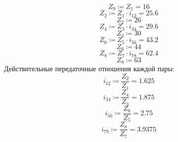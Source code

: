 \documentclass{article}
\newcommand{\defeq}{\coloneq} %
\begin{document}
\begin{equation*}
\textit{Z}_{\textit{9}} \defeq \textit{Z}_{\textit{1}} = {16}
\end{equation*}
\begin{equation*}
\textit{Z}_{\textit{2}} \defeq \textit{Z}_{\textit{1}} \cdot \textit{i}_{\textit{12}} = {25.6}
\end{equation*}
\begin{equation*}
\textit{Z}_{\textit{2}} \defeq 26
\end{equation*}
\begin{equation*}
\textit{Z}_{\textit{4}} \defeq \textit{Z}_{\textit{3}} \cdot \textit{i}_{\textit{34}} = {29.6}
\end{equation*}
\begin{equation*}
\textit{Z}_{\textit{4}} \defeq 30
\end{equation*}
\begin{equation*}
\textit{Z}_{\textit{6}} \defeq \textit{Z}_{\textit{5}} \cdot \textit{i}_{\textit{56}} = {43.2}
\end{equation*}
\begin{equation*}
\textit{Z}_{\textit{6}} \defeq 44
\end{equation*}
\begin{equation*}
\textit{Z}_{\textit{8}} \defeq \textit{Z}_{\textit{7}} \cdot \textit{i}_{\textit{78}} = {62.4}
\end{equation*}
\begin{equation*}
\textit{Z}_{\textit{8}} \defeq 63
\end{equation*}
\colorbox[HTML]{000000}{Действительные передаточные отношения каждой пары:}\newline
\begin{equation*}
\textit{i}_{\textit{12}} \defeq \frac{\textit{Z}_{\textit{2}}}{\textit{Z}_{\textit{1}}} = {1.625}
\end{equation*}
\begin{equation*}
\textit{i}_{\textit{34}} \defeq \frac{\textit{Z}_{\textit{4}}}{\textit{Z}_{\textit{3}}} = {1.875}
\end{equation*}
\begin{equation*}
\textit{i}_{\textit{56}} \defeq \frac{\textit{Z}_{\textit{6}}}{\textit{Z}_{\textit{5}}} = {2.75}
\end{equation*}
\begin{equation*}
\textit{i}_{\textit{78}} \defeq \frac{\textit{Z}_{\textit{8}}}{\textit{Z}_{\textit{7}}} = {3.9375}
\end{equation*}
\end{document}
